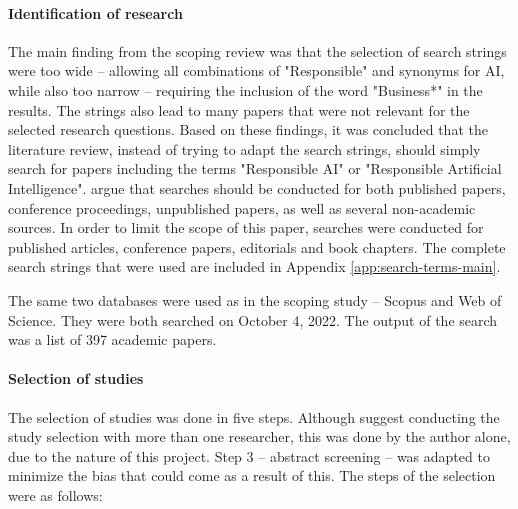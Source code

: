 \paragraph{Identification of research}
The main finding from the scoping review was that the selection of search strings were too wide -- allowing all combinations of "Responsible" and synonyms for AI, while also too narrow -- requiring the inclusion of the word "Business*" in the results. The strings also lead to many papers that were not relevant for the selected research questions. Based on these findings, it was concluded that the literature review, instead of trying to adapt the search strings, should simply search for papers including the terms "Responsible AI" or "Responsible Artificial Intelligence". \textcite{Tranfield_2003} argue that searches should be conducted for both published papers, conference proceedings, unpublished papers, as well as several non-academic sources. In order to limit the scope of this paper, searches were conducted for published articles, conference papers, editorials and book chapters. The complete search strings that were used are included in Appendix \ref{app:search-terms-main}. 

The same two databases were used as in the scoping study -- Scopus and Web of Science. They were both searched on October 4, 2022. The output of the search was a list of 397 academic papers.

\paragraph{Selection of studies}
The selection of studies was done in five steps. Although \textcite{Tranfield_2003} suggest conducting the study selection with more than one researcher, this was done by the author alone, due to the nature of this project. Step 3 -- abstract screening -- was adapted to minimize the bias that could come as a result of this. The steps of the selection were as follows:

